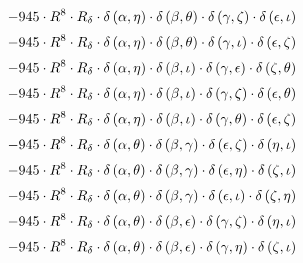 \begin{subequations}
\begin{gather}
 \\[0.2em] \notag 		 - 945 \cdot R^{8} \cdot R_{\delta{}} \cdot \delta{}\left(\alpha{}, \eta{}\right) \cdot \delta{}\left(\beta{}, \theta{}\right) \cdot \delta{}\left(\gamma{}, \zeta{}\right) \cdot \delta{}\left(\epsilon{}, \iota{}\right) 
 \\[0.2em] \notag 		 - 945 \cdot R^{8} \cdot R_{\delta{}} \cdot \delta{}\left(\alpha{}, \eta{}\right) \cdot \delta{}\left(\beta{}, \theta{}\right) \cdot \delta{}\left(\gamma{}, \iota{}\right) \cdot \delta{}\left(\epsilon{}, \zeta{}\right) 
 \\[0.2em] \notag 		 - 945 \cdot R^{8} \cdot R_{\delta{}} \cdot \delta{}\left(\alpha{}, \eta{}\right) \cdot \delta{}\left(\beta{}, \iota{}\right) \cdot \delta{}\left(\gamma{}, \epsilon{}\right) \cdot \delta{}\left(\zeta{}, \theta{}\right) 
 \\[0.2em] \notag 		 - 945 \cdot R^{8} \cdot R_{\delta{}} \cdot \delta{}\left(\alpha{}, \eta{}\right) \cdot \delta{}\left(\beta{}, \iota{}\right) \cdot \delta{}\left(\gamma{}, \zeta{}\right) \cdot \delta{}\left(\epsilon{}, \theta{}\right) 
 \\[0.2em] \notag 		 - 945 \cdot R^{8} \cdot R_{\delta{}} \cdot \delta{}\left(\alpha{}, \eta{}\right) \cdot \delta{}\left(\beta{}, \iota{}\right) \cdot \delta{}\left(\gamma{}, \theta{}\right) \cdot \delta{}\left(\epsilon{}, \zeta{}\right) 
 \\[0.2em] \notag 		 - 945 \cdot R^{8} \cdot R_{\delta{}} \cdot \delta{}\left(\alpha{}, \theta{}\right) \cdot \delta{}\left(\beta{}, \gamma{}\right) \cdot \delta{}\left(\epsilon{}, \zeta{}\right) \cdot \delta{}\left(\eta{}, \iota{}\right) 
 \\[0.2em] \notag 		 - 945 \cdot R^{8} \cdot R_{\delta{}} \cdot \delta{}\left(\alpha{}, \theta{}\right) \cdot \delta{}\left(\beta{}, \gamma{}\right) \cdot \delta{}\left(\epsilon{}, \eta{}\right) \cdot \delta{}\left(\zeta{}, \iota{}\right) 
 \\[0.2em] \notag 		 - 945 \cdot R^{8} \cdot R_{\delta{}} \cdot \delta{}\left(\alpha{}, \theta{}\right) \cdot \delta{}\left(\beta{}, \gamma{}\right) \cdot \delta{}\left(\epsilon{}, \iota{}\right) \cdot \delta{}\left(\zeta{}, \eta{}\right) 
 \\[0.2em] \notag 		 - 945 \cdot R^{8} \cdot R_{\delta{}} \cdot \delta{}\left(\alpha{}, \theta{}\right) \cdot \delta{}\left(\beta{}, \epsilon{}\right) \cdot \delta{}\left(\gamma{}, \zeta{}\right) \cdot \delta{}\left(\eta{}, \iota{}\right) 
 \\[0.2em] \notag 		 - 945 \cdot R^{8} \cdot R_{\delta{}} \cdot \delta{}\left(\alpha{}, \theta{}\right) \cdot \delta{}\left(\beta{}, \epsilon{}\right) \cdot \delta{}\left(\gamma{}, \eta{}\right) \cdot \delta{}\left(\zeta{}, \iota{}\right) 

\end{gather}
\end{subequations}
